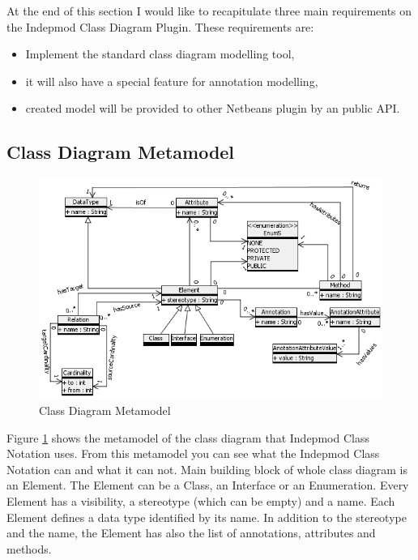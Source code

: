At the end of this section I would like to recapitulate three main requirements on the Indepmod Class Diagram Plugin. These requirements are:
\begin{itemize}
    \item Implement the standard class diagram modelling tool,
    \item it will also have a special feature for annotation modelling,
    \item created model will be provided to other Netbeans plugin by an public API.
\end{itemize}

\subsection{Class Diagram Metamodel}
\label{section-metamodel}

\begin{figure}[!ht]
\begin{center}
\includegraphics[scale=1]{img/classDiagramMetamodel.png}
\caption{Class Diagram Metamodel}
\label{f-classDiagramMetamodel}
\end{center}
\end{figure}

Figure \ref{f-classDiagramMetamodel} shows the metamodel of the class diagram that Indepmod Class Notation uses. From this metamodel you can see what the Indepmod Class Notation can and what it can not. Main building block of whole class diagram is an Element. The Element can be a Class, an Interface or an Enumeration. Every Element has a visibility, a stereotype (which can be empty) and a name. Each Element defines a data type identified by its name. In addition to the stereotype and the name, the Element has also the list of annotations, attributes and methods.


